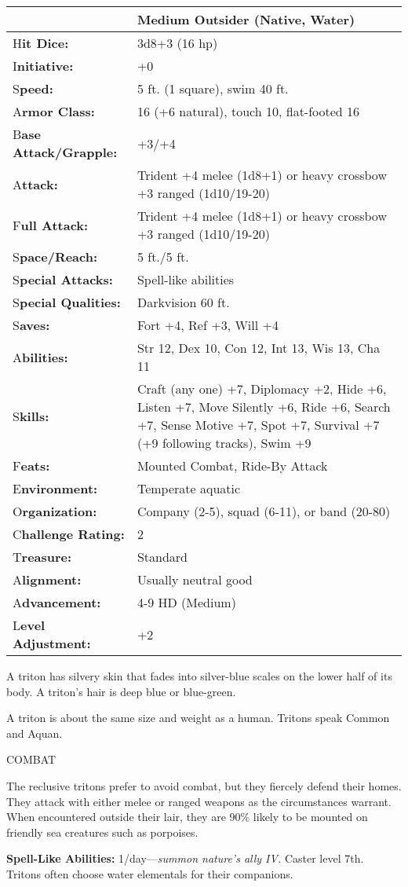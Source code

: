 \documentclass{article}
\begin{document}
\begin{tabular}{|>{\raggedright}p{79pt}|>{\raggedright}p{246pt}|}
\hline
  & Medium Outsider (Native, Water)\tabularnewline
\hline
H\textbf{it Dice:} & 3d8+3 (16 hp)\tabularnewline
\hline
I\textbf{nitiative:} & +0\tabularnewline
\hline
S\textbf{peed:} & 5 ft. (1 square), swim 40 ft.\tabularnewline
\hline
A\textbf{rmor Class:} & 16 (+6 natural), touch 10, flat-footed 16\tabularnewline
\hline
B\textbf{ase Attack/Grapple:} & +3/+4\tabularnewline
\hline
A\textbf{ttack:} & Trident +4 melee (1d8+1) or heavy crossbow +3 ranged (1d10/19-20)\tabularnewline
\hline
F\textbf{ull Attack:} & Trident +4 melee (1d8+1) or heavy crossbow +3 ranged (1d10/19-20)\tabularnewline
\hline
S\textbf{pace/Reach:} & 5 ft./5 ft.\tabularnewline
\hline
S\textbf{pecial Attacks:} & Spell-like abilities\tabularnewline
\hline
S\textbf{pecial Qualities:} & Darkvision 60 ft.\tabularnewline
\hline
S\textbf{aves:} & Fort +4, Ref +3, Will +4\tabularnewline
\hline
A\textbf{bilities:} & Str 12, Dex 10, Con 12, Int 13, Wis 13, Cha 11\tabularnewline
\hline
S\textbf{kills:} & Craft (any one) +7, Diplomacy +2, Hide +6, Listen +7, Move Silently 
+6, Ride +6, Search +7, Sense Motive +7, Spot +7, Survival +7 (+9 following tracks), 
Swim +9\tabularnewline
\hline
F\textbf{eats:} & Mounted Combat, Ride-By Attack\tabularnewline
\hline
E\textbf{nvironment:} & Temperate aquatic\tabularnewline
\hline
O\textbf{rganization:} & Company (2-5), squad (6-11), or band (20-80)\tabularnewline
\hline
C\textbf{hallenge Rating:} & 2\tabularnewline
\hline
T\textbf{reasure:} & Standard\tabularnewline
\hline
A\textbf{lignment:} & Usually neutral good\tabularnewline
\hline
A\textbf{dvancement:} & 4-9 HD (Medium) \tabularnewline
\hline
L\textbf{evel Adjustment:} & +2\tabularnewline
\hline
\end{tabular}

A triton has silvery skin that fades into silver-blue scales on the lower half 
of its body. A triton's hair is deep blue or blue-green.

A triton is about the same size and weight as a human. Tritons speak Common and 
Aquan.

COMBAT

The reclusive tritons prefer to avoid combat, but they fiercely defend their homes. 
They attack with either melee or ranged weapons as the circumstances warrant. When 
encountered outside their lair, they are 90\% likely to be mounted on friendly 
sea creatures such as porpoises.

\textbf{Spell-Like Abilities: }1/day---\textit{summon nature's ally IV. }Caster 
level 7th. Tritons often choose water elementals for their companions.
\end{document}
